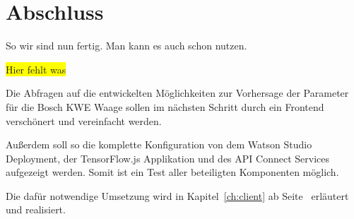 \section{Abschluss}
So wir sind nun fertig. Man kann es auch schon nutzen.

\colorbox{yellow}{Hier fehlt was}

Die Abfragen auf die entwickelten Möglichkeiten zur Vorhersage der Parameter für die Bosch KWE Waage sollen im nächsten
Schritt durch ein Frontend verschönert und vereinfacht werden.

Außerdem soll so die komplette Konfiguration von dem Watson Studio Deployment, der TensorFlow.js Applikation und des API
Connect Services aufgezeigt werden. Somit ist ein Test aller beteiligten Komponenten möglich.

Die dafür notwendige Umsetzung wird in Kapitel~\ref{ch:client} ab Seite~\pageref{ch:client} erläutert und realisiert.